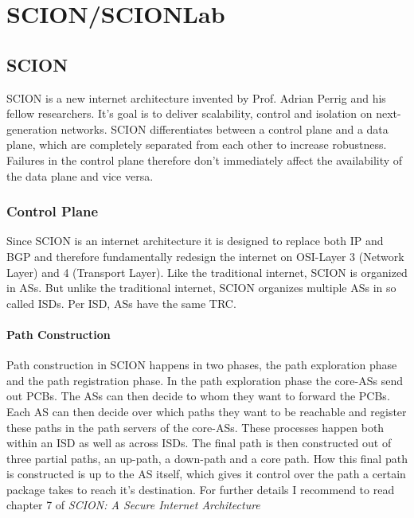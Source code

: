 \chapter{SCION/SCIONLab}

\section{SCION}
\acs{SCION} is a new internet architecture invented by Prof. Adrian Perrig and his fellow researchers. It's goal is to deliver scalability, control and isolation on next-generation networks. \acs{SCION} differentiates between a control plane and a data plane, which are completely separated from each other to increase robustness. Failures in the control plane therefore don't immediately affect the availability of the data plane and vice versa.

\subsection{Control Plane}
Since \acs{SCION} is an internet architecture it is designed to replace both \acs{IP} and \acs{BGP} and therefore fundamentally redesign the internet on \ac{OSI}-Layer 3 (Network Layer) and 4 (Transport Layer). Like the traditional internet, \acs{SCION} is organized in \aclp{AS}. But unlike the traditional internet, \acs{SCION} organizes multiple \acsp{AS} in so called \aclp{ISD}. Per \ac{ISD}, \acsp{AS} have the same \acl{TRC}.

\subsubsection{Path Construction}
Path construction in \acs{SCION} happens in two phases, the path exploration phase and the path registration phase. In the path exploration phase the core-\acsp{AS} send out \acp{PCB}. The \acsp{AS} can then decide to whom they want to forward the \acsp{PCB}. Each \acs{AS} can then decide over which paths they want to be reachable and register these paths in the path servers of the core-\acsp{AS}. These processes happen both within an \acs{ISD} as well as across \acsp{ISD}. The final path is then constructed out of three partial paths, an up-path, a down-path and a core path. How this final path is constructed is up to the \acs{AS} itself, which gives it control over the path a certain package takes to reach it's destination. For further details I recommend to read chapter 7 of \textit{SCION: A Secure Internet Architecture} \cite{perrig2017scion}

